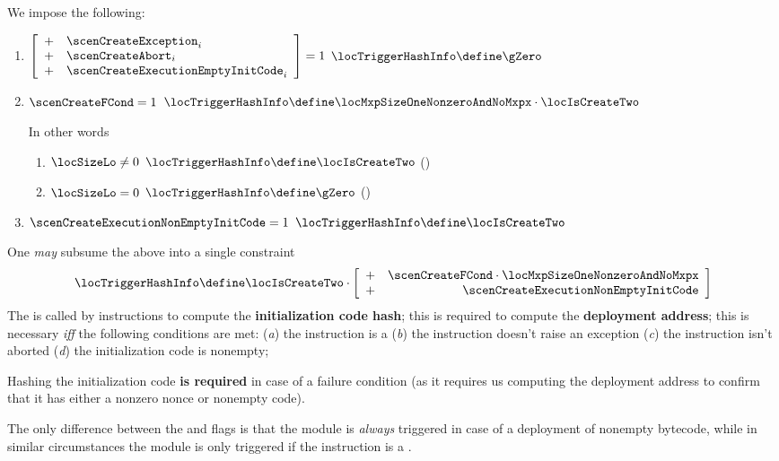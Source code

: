 We impose the following:
\begin{enumerate}
	\item \If 
		\(
		\left[ \begin{array}{ll}
			+ & \scenCreateException              _{i} \\
			+ & \scenCreateAbort                  _{i} \\
			+ & \scenCreateExecutionEmptyInitCode _{i} \\
		\end{array} \right] = 1
		\)
		\Then
		\( \locTriggerHashInfo \define \gZero \)
	\item \If $\scenCreateFCond = 1$ \Then $\locTriggerHashInfo \define \locMxpSizeOneNonzeroAndNoMxpx \cdot \locIsCreateTwo$

		\saNote{} In other words
		\begin{enumerate}
			\item \If $\locSizeLo \neq 0$ \Then $\locTriggerHashInfo \define \locIsCreateTwo$ (\trash)
			\item \If $\locSizeLo =    0$ \Then $\locTriggerHashInfo \define \gZero$          (\trash)
		\end{enumerate}
	\item \If $\scenCreateExecutionNonEmptyInitCode = 1$ \Then $\locTriggerHashInfo \define \locIsCreateTwo$
\end{enumerate}
\saNote{}
One \emph{may} subsume the above into a single constraint
\[
	\locTriggerHashInfo
	\define
	\locIsCreateTwo
	\cdot
	\left[ \begin{array}{cr}
		+ & \scenCreateFCond \cdot \locMxpSizeOneNonzeroAndNoMxpx \\
		+ & \scenCreateExecutionNonEmptyInitCode \\
	\end{array} \right]
\]
\saNote{} The \hashInfoMod{} is called by  instructions to compute the \textbf{initialization code hash};
this is required to compute the \textbf{deployment address};
this is necessary \emph{iff} the following conditions are met: 
(\emph{a}) the instruction is a 
(\emph{b}) the instruction doesn't raise an exception
(\emph{c}) the instruction isn't aborted
(\emph{d}) the initialization code is nonempty;

\saNote{} Hashing the initialization code \textbf{is required} in case of a failure condition (as it requires us computing the deployment address to confirm that it has either a nonzero nonce or nonempty code).

\saNote{} The only difference between the \locTriggerMmu{} and \locTriggerHashInfo{} flags is that the \mmuMod{} module is \emph{always} triggered in case of a deployment of nonempty bytecode, while in similar circumstances the \hashInfoMod{} module is only triggered if the instruction is a . 
